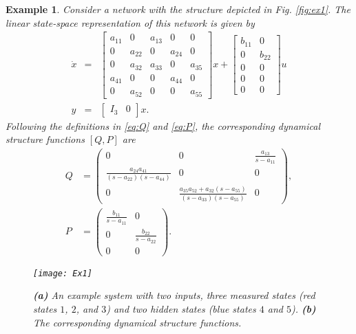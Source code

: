 \documentclass[twocolumn,12pt]{autart}
\theoremstyle{plain}
\newtheorem{example}{Example}
\begin{document}
\begin{example} \label{ex1}
Consider a network with the structure depicted in Fig. \ref{fig:ex1}. The linear state-space representation of this network is given by
\begin{equation*} \begin{array}{rcl}
\dot{x} &=& 
\begin{bmatrix}a_{11} & 0 & a_{13} & 0 & 0 \\
			0 & a_{22} & 0 & a_{24} & 0 \\
			0 & a_{32} & a_{33} & 0 & a_{35} \\
			a_{41} & 0 & 0 & a_{44} & 0 \\
			0 & a_{52} & 0 & 0 & a_{55} \end{bmatrix} x + 
\begin{bmatrix}b_{11} & 0 \\ 0 & b_{22} \\ 0 & 0 \\ 0 & 0 \\ 0 & 0 \end{bmatrix} u \\
y &=& \begin{bmatrix} I_3 & 0 \end{bmatrix} x.
\end{array} \end{equation*}
Following the definitions in \eqref{eq:Q} and \eqref{eq:P}, the corresponding dynamical structure functions $[{Q},{P}]$ are
\begin{align*}
Q &= \begin{pmatrix} 0 & 0 & \frac{a_{13}}{s-a_{11}} \\ \frac{a_{24}a_{41}}{(s-a_{22})(s-a_{44})} & 0 & 0 \\ 0 & \frac{a_{35}a_{52} + a_{32}(s-a_{55})}{(s-a_{33})(s-a_{55})} & 0 \end{pmatrix}, \\
P &= \begin{pmatrix} \frac{b_{11}}{s-a_{11}} & 0 \\ 0 & \frac{b_{22}}{s-a_{22}} \\ 0 & 0 \end{pmatrix}.
\end{align*}
\begin{figure}[!] \centering
\texttt{[image: Ex1]}
\caption{\textbf{(a)} An example system with two inputs, three measured states (red states $1$, $2$, and $3$) and two hidden states (blue states $4$ and $5$). \textbf{(b)} The corresponding dynamical structure functions.}

\end{figure}
\end{example}
\end{document}
